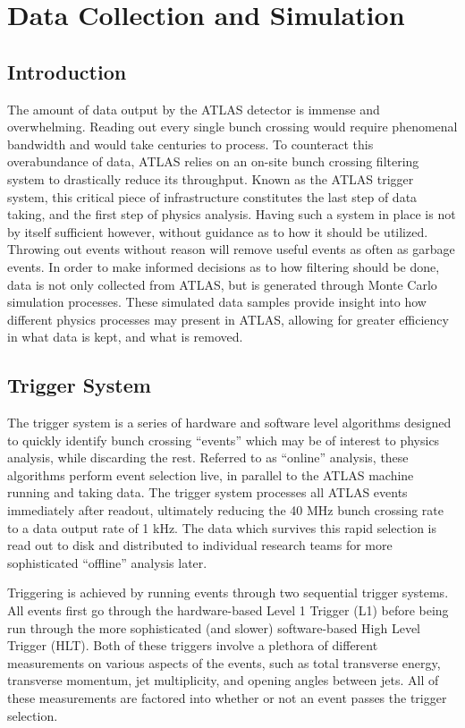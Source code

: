 \chapter{Data Collection and Simulation} \label{chapter:data}

\section{Introduction}
    The amount of data output by the ATLAS detector is immense and overwhelming.
    Reading out every single bunch crossing would require phenomenal bandwidth and would take centuries to process.
    To counteract this overabundance of data, ATLAS relies on an on-site bunch crossing filtering system to drastically reduce its throughput.
    Known as the ATLAS trigger system, this critical piece of infrastructure constitutes the last step of data taking, and the first step of physics analysis.
    Having such a system in place is not by itself sufficient however, without guidance as to how it should be utilized.
    Throwing out events without reason will remove useful events as often as garbage events.
    In order to make informed decisions as to how filtering should be done,
        data is not only collected from ATLAS, but is generated through Monte Carlo simulation processes.
    These simulated data samples provide insight into how different physics processes may present in ATLAS,
        allowing for greater efficiency in what data is kept, and what is removed.


\section{Trigger System}

    The trigger system is a series of hardware and software level algorithms designed to quickly identify bunch crossing ``events'' which may be of interest to physics analysis, while discarding the rest.
    Referred to as ``online'' analysis, these algorithms perform event selection live, in parallel to the ATLAS machine running and taking data.
    The trigger system processes all ATLAS events immediately after readout, ultimately reducing the 40 MHz bunch crossing rate to a data output rate of 1 kHz.
    The data which survives this rapid selection is read out to disk and distributed to individual research teams for more sophisticated ``offline'' analysis later.
    
    Triggering is achieved by running events through two sequential trigger systems.
    All events first go through the hardware-based Level 1 Trigger (L1) before being run through the more sophisticated (and slower) software-based High Level Trigger (HLT).
    Both of these triggers involve a plethora of different measurements on various aspects of the events, such as total transverse energy, transverse momentum, jet multiplicity, and opening angles between jets.
    All of these measurements are factored into whether or not an event passes the trigger selection.

